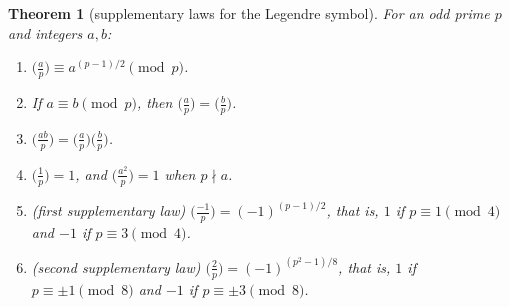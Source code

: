 \documentclass[11pt]{article}
\theoremstyle{ntstyle}
\newtheorem{theorem}{Theorem}[subsection]
\newcommand{\legs}[2]{\bigl(\tfrac{#1}{#2}\bigr)}
\begin{document}
\begin{theorem}[supplementary laws for the Legendre symbol]\label{thm:7.2.5} For an odd prime $p$
	and integers $a, b$:

	\begin{enumerate}[label={\alph*)}]
		\item $\legs{a}{p} \equiv a^{(p-1)/2} \pmod{p}$.

		\item If $a \equiv b \pmod{p}$, then $\legs{a}{p} =
						\legs{b}{p}$.

		\item $\legs{ab}{p} =
						\legs{a}{p}\legs{b}{p}$.

		\item $\legs{1}{p} = 1$, and $\legs{a^{2}}{p}
						= 1$ when $p \nmid a$.

		\item (first supplementary law) $\legs{-1}{p} = (-1)^{(p-1)/2}$, that is,
					$1$ if $p \equiv 1 \pmod{4}$ and $-1$ if $p \equiv 3 \pmod{4}$.

		\item (second supplementary law) $\legs{2}{p} = (-1)^{(p^{2}-1)/8}$, that
					is, $1$ if $p \equiv \pm 1 \pmod{8}$ and $-1$ if $p \equiv \pm 3
						\pmod{8}$.
	\end{enumerate}
\end{theorem}
\end{document}
